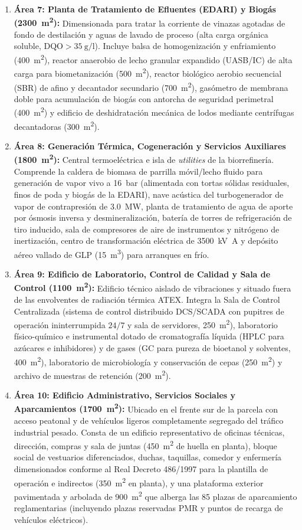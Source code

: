 \documentclass{report}
\begin{document}
\begin{enumerate}
    \item \textbf{Área 7: Planta de Tratamiento de Efluentes (EDARI) y Biogás (\SI{2300}{\square\metre}):} Dimensionada para tratar la corriente de vinazas agotadas de fondo de destilación y aguas de lavado de proceso (alta carga orgánica soluble, $\text{DQO} > \SI{35}{\gram/\litre}$). Incluye balsa de homogenización y enfriamiento (\SI{400}{\square\metre}), reactor anaerobio de lecho granular expandido (UASB/IC) de alta carga para biometanización (\SI{500}{\square\metre}), reactor biológico aerobio secuencial (SBR) de afino y decantador secundario (\SI{700}{\square\metre}), gasómetro de membrana doble para acumulación de biogás con antorcha de seguridad perimetral (\SI{400}{\square\metre}) y edificio de deshidratación mecánica de lodos mediante centrífugas decantadoras (\SI{300}{\square\metre}).
    \item \textbf{Área 8: Generación Térmica, Cogeneración y Servicios Auxiliares (\SI{1800}{\square\metre}):} Central termoeléctrica e isla de \textit{utilities} de la biorrefinería. Comprende la caldera de biomasa de parrilla móvil/lecho fluido para generación de vapor vivo a \SI{16}{bar} (alimentada con tortas sólidas residuales, finos de poda y biogás de la EDARI), nave acústica del turbogenerador de vapor de contrapresión de \SI{3.0}{\mega\watt}, planta de tratamiento de agua de aporte por ósmosis inversa y desmineralización, batería de torres de refrigeración de tiro inducido, sala de compresores de aire de instrumentos y nitrógeno de inertización, centro de transformación eléctrica de \SI{3500}{\kilo\volt\ampere} y depósito aéreo vallado de GLP (\SI{15}{\cubic\metre}) para arranques en frío.
    \item \textbf{Área 9: Edificio de Laboratorio, Control de Calidad y Sala de Control (\SI{1100}{\square\metre}):} Edificio técnico aislado de vibraciones y situado fuera de las envolventes de radiación térmica ATEX. Integra la Sala de Control Centralizada (sistema de control distribuido DCS/SCADA con pupitres de operación ininterrumpida $24/7$ y sala de servidores, \SI{250}{\square\metre}), laboratorio físico-químico e instrumental dotado de cromatografía líquida (HPLC para azúcares e inhibidores) y de gases (GC para pureza de bioetanol y solventes, \SI{400}{\square\metre}), laboratorio de microbiología y conservación de cepas (\SI{250}{\square\metre}) y archivo de muestras de retención (\SI{200}{\square\metre}).
    \item \textbf{Área 10: Edificio Administrativo, Servicios Sociales y Aparcamientos (\SI{1700}{\square\metre}):} Ubicado en el frente sur de la parcela con acceso peatonal y de vehículos ligeros completamente segregado del tráfico industrial pesado. Consta de un edificio representativo de oficinas técnicas, dirección, compras y sala de juntas (\SI{450}{\square\metre} de huella en planta), bloque social de vestuarios diferenciados, duchas, taquillas, comedor y enfermería dimensionados conforme al Real Decreto 486/1997 para la plantilla de operación e indirectos (\SI{350}{\square\metre} en planta), y una plataforma exterior pavimentada y arbolada de \SI{900}{\square\metre} que alberga las \num{85} plazas de aparcamiento reglamentarias (incluyendo plazas reservadas PMR y puntos de recarga de vehículos eléctricos).

\end{enumerate}
\end{document}
